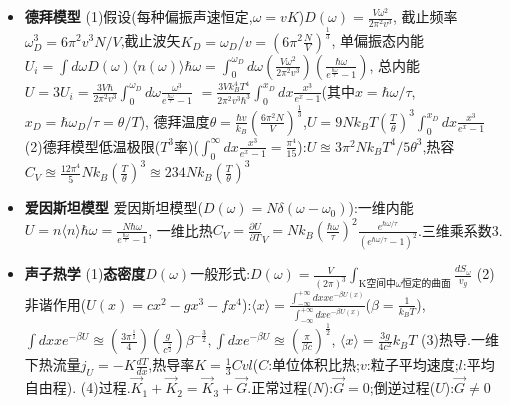 \documentclass[UTF8,a4paper,3pt,twocolumn]{ctexart}
\begin{document}
\begin{itemize}
  \item \textbf{德拜模型}
  (1)假设(每种偏振声速恒定,$\omega=vK$)$D(\omega)=\frac{V\omega^2}{2\pi^{2}v^3}$,
  截止频率$\omega_{D}^3=6\pi^{2}v^{3}N/V$,截止波矢$K_{D}=\omega_{D}/v=(6\pi^{2}\frac{N}{V})^{\frac{1}{3}}$,
  单偏振态内能$U_i=\int d\omega D(\omega)\langle n(\omega)\rangle\hbar\omega
  =\int_{0}^{\omega_{D}}d\omega(\frac{V\omega^{2}}{2\pi^{2}v^{3}})(\frac{\hbar\omega}{e^{\frac{\hbar\omega}{\tau}}-1})$,
  总内能$U=3U_i=\frac{3V\hbar}{2\pi^2 v^3}\int_{0}^{\omega_{D}}d\omega\frac{\omega^3}{e^{\frac{\hbar\omega}{\tau}}-1}$
  $=\frac{3Vk_{B}^{4}T^{4}}{2\pi^2 v^3 \hbar^3}\int_{0}^{x_{D}}dx\frac{x^3}{e^x - 1}$(其中$x=\hbar\omega/\tau$,$x_{D}=\hbar\omega_{D}/\tau=\theta/T$),
  德拜温度$\theta=\frac{\hbar v}{k_{B}}(\frac{6\pi^2N}{V})^{\frac{1}{3}}$,$U=9Nk_{B}T(\frac{T}{\theta})^3\int_{0}^{x_D}dx\frac{x^3}{e^x -1}$
  (2)德拜模型低温极限($T^3$率)($\int_{0}^{\infty}dx\frac{x^3}{e^x -1}=\frac{\pi^4}{15}$):$U\approxeq3\pi^2 Nk_{B}T^4/5\theta^3$,热容$C_{V}\approxeq\frac{12\pi^4}{5}Nk_{B}(\frac{T}{\theta})^3\approxeq 234Nk_{B}(\frac{T}{\theta})^3$
  
  \item \textbf{爱因斯坦模型}
  爱因斯坦模型($D(\omega)=N\delta(\omega-\omega_{0})$):一维内能$U=n\langle n\rangle\hbar\omega=\frac{N\hbar\omega}{e^{\frac{\hbar\omega}{\tau}}-1}$,
  一维比热$C_{V}=\frac{\partial U}{\partial T}_{V}=Nk_{B}(\frac{\hbar\omega}{\tau})^2\frac{e^{\hbar\omega/\tau}}{(e^{\hbar\omega/\tau}-1)^2}$.三维乘系数3.
  
  \item \textbf{声子热学}
  (1)\textbf{态密度}$D(\omega)$一般形式:$D(\omega)=\frac{V}{(2\pi)^3}\int_{\text{K空间中}\omega\text{恒定的曲面}}\frac{dS_{\omega}}{v_{g}}$
  (2)非谐作用($U(x)=cx^2-gx^3-fx^4$):$\langle x\rangle=\frac{\int_{-\infty}^{+\infty}dx xe^{-\beta U(x)}}{\int_{-\infty}^{+\infty}dx e^{-\beta U(x)}}$($\beta=\frac{1}{k_{B}T}$),
  $\int dx xe^{-\beta U}\approxeq(\frac{3\pi^{\frac{1}{2}}}{4})(\frac{g}{c^{\frac{5}{2}}})\beta^{-\frac{3}{2}},\int dxe^{-\beta U}\approxeq(\frac{\pi}{\beta c})^{\frac{1}{2}}$,
  $\langle x\rangle=\frac{3g}{4c^2}k_{B}T$
  (3)热导.一维下热流量$j_{U}=-K\frac{dT}{dx}$,热导率$K=\frac{1}{3}Cvl$($C$:单位体积比热;$v$:粒子平均速度;$l$:平均自由程).
  (4)过程.$\vec{K}_{1}+\vec{K}_{2}=\vec{K}_{3}+\vec{G}$.正常过程($N$):$\vec{G}=0$;倒逆过程($U$):$\vec{G}\neq 0$


\end{itemize}
\end{document}
